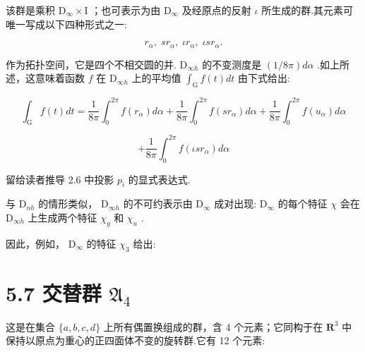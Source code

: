 \documentclass[10pt]{article}
\begin{document}
该群是乘积 \({\mathrm{D}}_{\infty } \times  \mathrm{I}\) ；也可表示为由 \({\mathrm{D}}_{\infty }\) 及经原点的反射 \(\iota\) 所生成的群.其元素可唯一写成以下四种形式之一:

\[
{r}_{\alpha },\;s{r}_{\alpha },\;\iota {r}_{\alpha },\;{\iota s}{r}_{\alpha }.
\]

作为拓扑空间，它是四个不相交圆的并. \({\mathrm{D}}_{\infty h}\) 的不变测度是 \(\left( {1/{8\pi }}\right) {d\alpha }\) .如上所述，这意味着函数 \(f\) 在 \({\mathrm{D}}_{\infty h}\) 上的平均值 \({\int }_{\mathrm{G}}f\left( t\right) {dt}\) 由下式给出:

\[
{\int }_{\mathrm{G}}f\left( t\right) {dt} = \frac{1}{8\pi }{\int }_{0}^{2\pi }f\left( {r}_{\alpha }\right) {d\alpha } + \frac{1}{8\pi }{\int }_{0}^{2\pi }f\left( {s{r}_{\alpha }}\right) {d\alpha } + \frac{1}{8\pi }{\int }_{0}^{2\pi }f\left( {u}_{\alpha }\right) {d\alpha }
\]

\[
+ \frac{1}{8\pi }{\int }_{0}^{2\pi }f\left( {{\iota s}{r}_{\alpha }}\right) {d\alpha }
\]

留给读者推导 2.6 中投影 \({p}_{i}\) 的显式表达式.

与 \({\mathrm{D}}_{nh}\) 的情形类似， \({\mathrm{D}}_{\infty h}\) 的不可约表示由 \({\mathrm{D}}_{\infty }\) 成对出现: \({\mathrm{D}}_{\infty }\) 的每个特征 \(\chi\) 会在 \({\mathrm{D}}_{\infty h}\) 上生成两个特征 \({\chi }_{g}\) 和 \({\chi }_{u}\) .

因此，例如， \({\mathrm{D}}_{\infty }\) 的特征 \({\chi }_{3}\) 给出:

\begin{center}
\end{center}

\section*{5.7 交替群 \({\mathfrak{A}}_{4}\)}

这是在集合 \(\{ a,b,c,d\}\) 上所有偶置换组成的群，含 4 个元素；它同构于在 \({\mathbf{R}}^{3}\) 中保持以原点为重心的正四面体不变的旋转群.它有 12 个元素:
\end{document}
